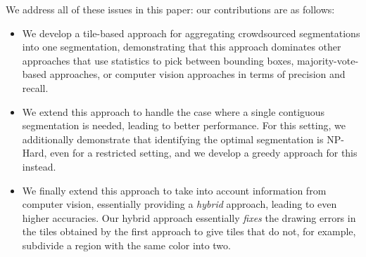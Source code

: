 \documentclass[letterpaper]{article} %
\begin{document}
We address all of these issues in this paper: 
our contributions are as follows:
\begin{itemize}
\item We develop a tile-based approach for aggregating
crowdsourced segmentations into one segmentation,
demonstrating that this approach dominates other approaches
that use statistics to pick between bounding boxes, majority-vote-based
approaches, or computer vision approaches in terms of precision and recall.
\item We extend this approach to handle the case where 
a single contiguous segmentation is needed, leading to better performance.
For this setting, we additionally demonstrate that identifying the optimal 
segmentation is {\sc NP-Hard}, even for a restricted setting,
and we develop a greedy approach for this instead. 
\item We finally extend this approach to take into account
information from computer vision, essentially providing a
{\em hybrid} approach, leading to even higher accuracies. 
Our hybrid approach essentially {\em fixes} the
drawing errors in the tiles obtained
by the first approach to give tiles that do not, for example,
subdivide a region with the same color into two. 
\end{itemize}



\end{document}
